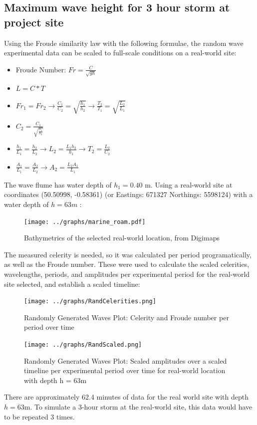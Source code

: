 \documentclass{article}
\begin{document}
	\subsection{Maximum wave height for 3 hour storm at project site}
	Using the Froude similarity law with the following formulae, the random wave experimental data can be scaled to full-scale conditions on a real-world site:
	\begin{itemize}
		\item Froude Number: $Fr = \frac{C}{\sqrt{gh}}$
		\item $L = C * T$
		\item $Fr_1 = Fr_2 \to \frac{C_1}{C_2} = \sqrt{\frac{h_1}{h_2}}\to \frac{T_2}{T_1} = \sqrt{\frac{L_2}{L_1}}$
		\item $C_2 = \frac{C_1}{\sqrt{\frac{h_1}{h_2}}}$
		\item $\frac{h_1}{L_1} = \frac{h_2}{L_2} \to L_2 = \frac{L_1 h_2}{h_1} \to T_2 = \frac{L_2}{C_2}$
		\item $\frac{A_1}{L_1} = \frac{A_2}{L_2} \to A_2 = \frac{L_2 A_1}{L_1}$
	\end{itemize}
	The wave flume has water depth of $h_1 = 0.40$ m. Using a real-world site at coordinates (50.50998, -0.58361) (or Eastings: 671327 Northings: 5598124) with a water depth of $h = 63m$ \cite{digimap}:
	\begin{figure}[H]
		\centering
		\texttt{[image: ../graphs/marine\_roam.pdf]}
		\caption{Bathymetrics of the selected real-world location, from Digimaps \cite{digimap}}
		\label{bathymetrics}
	\end{figure}
	The measured celerity is needed, so it was calculated per period programatically, as well as the Froude number. These were used to calculate the scaled celerities, wavelengths, periods, and amplitudes per experimental period for the real-world site selected, and establish a scaled timeline:\\
	\begin{figure}[H]
		\centering
		\texttt{[image: ../graphs/RandCelerities.png]}
		\caption{Randomly Generated Waves Plot: Celerity and Froude number per period over time}
		\label{randcelerity}
	\end{figure}
	\begin{figure}[H]
		\centering
		\texttt{[image: ../graphs/RandScaled.png]}
		\caption{Randomly Generated Waves Plot: Scaled amplitudes over a scaled timeline per experimental period over time for real-world location with depth h = 63m}
		\label{randscaled}
	\end{figure}
	There are approximately 62.4 minutes of data for the real world site with depth $h = 63$m. To simulate a 3-hour storm at the real-world site, this data would have to be repeated 3 times. 
\end{document}

